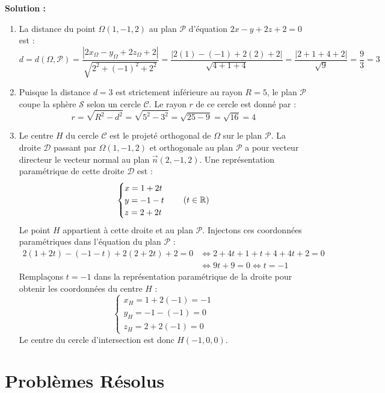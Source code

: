 \textbf{Solution :}
\begin{enumerate}
    \item La distance du point $\Omega(1, -1, 2)$ au plan $\mathcal{P}$ d'équation $2x - y + 2z + 2 = 0$ est :
    \[
    d = d(\Omega, \mathcal{P}) = \frac{|2x_\Omega - y_\Omega + 2z_\Omega + 2|}{\sqrt{2^2 + (-1)^2 + 2^2}} = \frac{|2(1) - (-1) + 2(2) + 2|}{\sqrt{4 + 1 + 4}} = \frac{|2 + 1 + 4 + 2|}{\sqrt{9}} = \frac{9}{3} = 3
    \]
    
    \item Puisque la distance $d = 3$ est strictement inférieure au rayon $R = 5$, le plan $\mathcal{P}$ coupe la sphère $\mathcal{S}$ selon un cercle $\mathcal{C}$.
    Le rayon $r$ de ce cercle est donné par :
    \[
    r = \sqrt{R^2 - d^2} = \sqrt{5^2 - 3^2} = \sqrt{25 - 9} = \sqrt{16} = 4
    \]
    
    \item Le centre $H$ du cercle $\mathcal{C}$ est le projeté orthogonal de $\Omega$ sur le plan $\mathcal{P}$.
    La droite $\mathcal{D}$ passant par $\Omega(1, -1, 2)$ et orthogonale au plan $\mathcal{P}$ a pour vecteur directeur le vecteur normal au plan $\vec{n}(2, -1, 2)$.
    Une représentation paramétrique de cette droite $\mathcal{D}$ est :
    \[
    \begin{cases}
    x = 1 + 2t \\
    y = -1 - t \\
    z = 2 + 2t
    \end{cases} \quad (t \in \mathbb{R})
    \]
    Le point $H$ appartient à cette droite et au plan $\mathcal{P}$. Injectons ces coordonnées paramétriques dans l'équation du plan $\mathcal{P}$ :
    \[
    \begin{aligned}
    2(1 + 2t) - (-1 - t) + 2(2 + 2t) + 2 = 0 &\iff 2 + 4t + 1 + t + 4 + 4t + 2 = 0 \\
    &\iff 9t + 9 = 0 \iff t = -1
    \end{aligned}
    \]
    Remplaçons $t = -1$ dans la représentation paramétrique de la droite pour obtenir les coordonnées du centre $H$ :
    \[
    \begin{cases}
    x_H = 1 + 2(-1) = -1 \\
    y_H = -1 - (-1) = 0 \\
    z_H = 2 + 2(-1) = 0
    \end{cases}
    \]
    Le centre du cercle d'intersection est donc $H(-1, 0, 0)$.
\end{enumerate}

\section{Problèmes Résolus}

